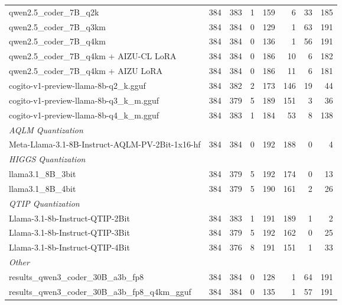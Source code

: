 \begin{table}[htbp]
{\begin{tabular}{lrrrrrrr}
    qwen2.5\_coder\_7B\_q2k & 384 & 383 & 1 & 159 & 6 & 33 & 185 \\
    qwen2.5\_coder\_7B\_q3km & 384 & 384 & 0 & 129 & 1 & 63 & 191 \\
    qwen2.5\_coder\_7B\_q4km & 384 & 384 & 0 & 136 & 1 & 56 & 191 \\
    qwen2.5\_coder\_7B\_q4km + AIZU-CL LoRA & 384 & 384 & 0 & 186 & 10 & 6 & 182 \\
    qwen2.5\_coder\_7B\_q4km + AIZU LoRA & 384 & 384 & 0 & 186 & 11 & 6 & 181 \\
    cogito-v1-preview-llama-8b-q2\_k.gguf & 384 & 382 & 2 & 173 & 146 & 19 & 44 \\
    cogito-v1-preview-llama-8b-q3\_k\_m.gguf & 384 & 379 & 5 & 189 & 151 & 3 & 36 \\
    cogito-v1-preview-llama-8b-q4\_k\_m.gguf & 384 & 383 & 1 & 184 & 53 & 8 & 138 \\
    \midrule
    \multicolumn{8}{l}{\textit{AQLM Quantization}} \\
    \midrule
    Meta-Llama-3.1-8B-Instruct-AQLM-PV-2Bit-1x16-hf & 384 & 384 & 0 & 192 & 188 & 0 & 4 \\
    \midrule
    \multicolumn{8}{l}{\textit{HIGGS Quantization}} \\
    \midrule
    llama3.1\_8B\_3bit & 384 & 379 & 5 & 192 & 174 & 0 & 13 \\
    llama3.1\_8B\_4bit & 384 & 379 & 5 & 190 & 161 & 2 & 26 \\
    \midrule
    \multicolumn{8}{l}{\textit{QTIP Quantization}} \\
    \midrule
    Llama-3.1-8b-Instruct-QTIP-2Bit & 384 & 383 & 1 & 191 & 189 & 1 & 2 \\
    Llama-3.1-8b-Instruct-QTIP-3Bit & 384 & 379 & 5 & 192 & 162 & 0 & 25 \\
    Llama-3.1-8b-Instruct-QTIP-4Bit & 384 & 376 & 8 & 191 & 151 & 1 & 33 \\
    \midrule
    \multicolumn{8}{l}{\textit{Other}} \\
    \midrule
    results\_qwen3\_coder\_30B\_a3b\_fp8 & 384 & 384 & 0 & 128 & 1 & 64 & 191 \\
    results\_qwen3\_coder\_30B\_a3b\_fp8\_q4km\_gguf & 384 & 384 & 0 & 135 & 1 & 57 & 191 \\
    \bottomrule
  \end{tabular}
  }
\end{table}

